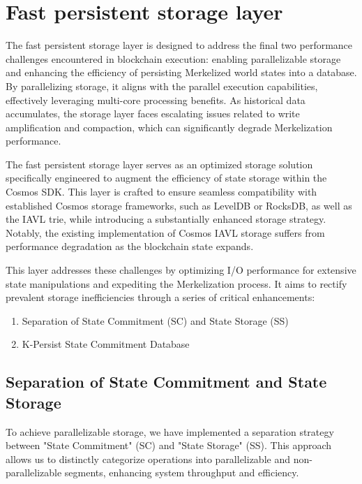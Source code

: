 \section{Fast persistent storage layer}

The fast persistent storage layer is designed to address the final two performance challenges encountered in blockchain execution: enabling parallelizable storage and enhancing the efficiency of persisting Merkelized world states into a database. By parallelizing storage, it aligns with the parallel execution capabilities, effectively leveraging multi-core processing benefits. As historical data accumulates, the storage layer faces escalating issues related to write amplification and compaction, which can significantly degrade Merkelization performance.

The fast persistent storage layer serves as an optimized storage solution specifically engineered to augment the efficiency of state storage within the Cosmos SDK. This layer is crafted to ensure seamless compatibility with established Cosmos storage frameworks, such as LevelDB or RocksDB, as well as the IAVL trie\cite{cosmos_iavl}\cite{simmon_avl_trees}, while introducing a substantially enhanced storage strategy. Notably, the existing implementation of Cosmos IAVL storage suffers from performance degradation as the blockchain state expands.

This layer addresses these challenges by optimizing I/O performance for extensive state manipulations and expediting the Merkelization process. It aims to rectify prevalent storage inefficiencies through a series of critical enhancements:

\begin{enumerate}
    \item Separation of State Commitment (SC) and State Storage (SS)
    \item K-Persist State Commitment Database
\end{enumerate}

\subsection{Separation of State Commitment and State Storage}

To achieve parallelizable storage, we have implemented a separation strategy between "State Commitment" (SC) and "State Storage" (SS). This approach allows us to distinctly categorize operations into parallelizable and non-parallelizable segments, enhancing system throughput and efficiency.

